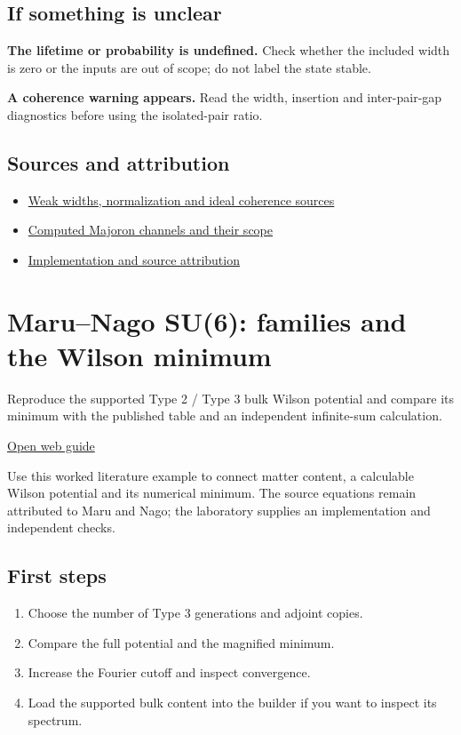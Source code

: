 \documentclass[11pt,a4paper]{article}
\begin{document}
\subsection*{If something is unclear}
\textbf{The lifetime or probability is undefined.} Check whether the included width is zero or the inputs are out of scope; do not label the state stable.

\textbf{A coherence warning appears.} Read the width, insertion and inter-pair-gap diagnostics before using the isolated-pair ratio.

\subsection*{Sources and attribution}
\begin{itemize}
\item \href{https://github.com/karlesmarin/ghu-lab/blob/main/docs/neutrino-decays.md}{Weak widths, normalization and ideal coherence sources}
\item \href{https://github.com/karlesmarin/ghu-lab/blob/main/docs/neutrino-majoron.md}{Computed Majoron channels and their scope}
\item \href{https://github.com/karlesmarin/ghu-lab/blob/main/src/view/neutrino_decay_panel.js}{Implementation and source attribution}
\end{itemize}
\section{Maru--Nago SU(6): families and the Wilson minimum}
Reproduce the supported Type 2 / Type 3 bulk Wilson potential and compare its minimum with the published table and an independent infinite-sum calculation.

\href{https://karlesmarin.github.io/ghu-explorer/guide/su6mn/index.html}{Open web guide}

Use this worked literature example to connect matter content, a calculable Wilson potential and its numerical minimum. The source equations remain attributed to Maru and Nago; the laboratory supplies an implementation and independent checks.
\subsection*{First steps}
\begin{enumerate}
\item Choose the number of Type 3 generations and adjoint copies.
\item Compare the full potential and the magnified minimum.
\item Increase the Fourier cutoff and inspect convergence.
\item Load the supported bulk content into the builder if you want to inspect its spectrum.
\end{enumerate}
\end{document}
